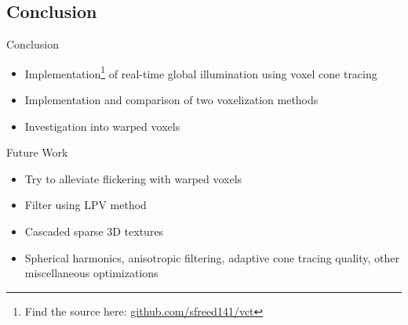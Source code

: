 \documentclass[10pt]{beamer}
\begin{document}



\subsection{Conclusion}
\begin{frame}{Conclusion}
  \begin{itemize}
    \item Implementation\footnote{Find the source here: \url{github.com/sfreed141/vct}} of real-time global illumination using voxel cone tracing
    \item Implementation and comparison of two voxelization methods
    \item Investigation into warped voxels
  \end{itemize}
\end{frame}

\begin{frame}{Future Work}


  \begin{itemize}
    \item Try to alleviate flickering with warped voxels %
    \item Filter using LPV method %
    \item Cascaded sparse 3D textures %
    \item Spherical harmonics, anisotropic filtering, adaptive cone tracing quality, other miscellaneous optimizations %
  \end{itemize}
\end{frame}
\end{document}
